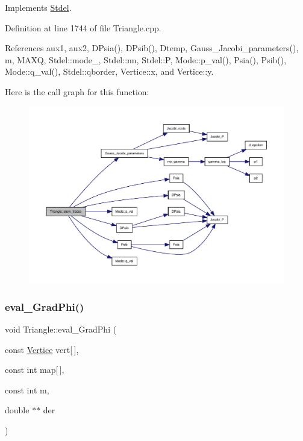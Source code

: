 Implements \hyperlink{classStdel_a3d72869352a2ff5eeb23972eca3b391e}{Stdel}.



Definition at line 1744 of file Triangle.\+cpp.



References aux1, aux2, D\+Psia(), D\+Psib(), Dtemp, Gauss\+\_\+\+Jacobi\+\_\+parameters(), m, M\+A\+XQ, Stdel\+::mode\+\_\+, Stdel\+::nn, Stdel\+::P, Mode\+::p\+\_\+val(), Psia(), Psib(), Mode\+::q\+\_\+val(), Stdel\+::qborder, Vertice\+::x, and Vertice\+::y.

Here is the call graph for this function\+:
\nopagebreak
\begin{figure}[H]
\begin{center}
\leavevmode
\includegraphics[width=350pt]{classTriangle_ad27047d488aa9454fb5dbce44493bc52_cgraph}
\end{center}
\end{figure}
\mbox{\label{classTriangle_a123dce9963455a2c5d932f677f3405f7}} 
\subsubsection{\texorpdfstring{eval\+\_\+\+Grad\+Phi()}{eval\_GradPhi()}}
{\footnotesize\ttfamily void Triangle\+::eval\+\_\+\+Grad\+Phi (\begin{DoxyParamCaption}\item[{const \hyperlink{structVertice}{Vertice}}]{vert\mbox{[}$\,$\mbox{]},  }\item[{const int}]{map\mbox{[}$\,$\mbox{]},  }\item[{const int}]{m,  }\item[{double $\ast$$\ast$}]{der }\end{DoxyParamCaption})\hspace{0.3cm}{\ttfamily [virtual]}}



